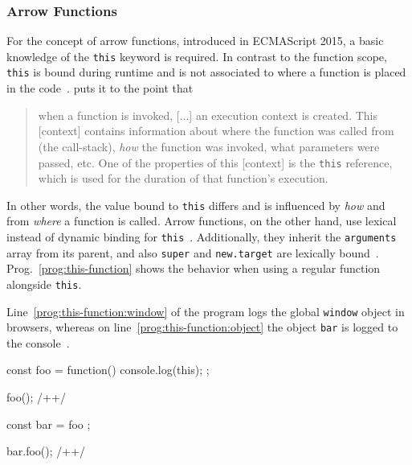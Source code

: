 \subsubsection{Arrow Functions}

For the concept of arrow functions, introduced in ECMAScript 2015, a basic knowledge of the \texttt{this} keyword is required. In contrast to the function scope, \texttt{this} is bound during runtime and is not associated to where a function is placed in the code~\cite[p.~9]{YDKJS:ThisAndObjectPrototypes:Simpson:2015}. \citeauthor{YDKJS:ThisAndObjectPrototypes:Simpson:2015} puts it to the point that
\begin{quote}
  when a function is invoked, [...] an execution context is created. This [context] contains information about where the function was called from (the call-stack), \emph{how} the function was invoked, what parameters were passed, etc. One of the properties of this [context] is the \texttt{this} reference, which is used for the duration of that function’s execution.~\cite[p.~1]{YDKJS:ThisAndObjectPrototypes:Simpson:2015}
\end{quote}
In other words, the value bound to \texttt{this} differs and is influenced by \emph{how} and from \emph{where} a function is called. Arrow functions, on the other hand, use lexical instead of dynamic binding for \texttt{this}~\cite[p.~58]{YDKJS:ES6AndBeyond:Simpson:2015}. Additionally, they inherit the \texttt{arguments} array from its parent, and also \texttt{super} and \texttt{new.target} are lexically bound~\cite[p.~59]{YDKJS:ES6AndBeyond:Simpson:2015}. Prog.~\ref{prog:this-function} shows the behavior when using a regular function alongside \texttt{this}.
\begin{program}
\caption{Line~\ref{prog:this-function:window} of the program logs the global \texttt{window} object in browsers, whereas on line~\ref{prog:this-function:object} the object \texttt{bar} is logged to the console~\cite[p.~18]{TypeScriptBook:Syed:2017}.}
\label{prog:this-function}
\begin{JsCode}
const foo = function() {
  console.log(this);
};

foo(); /+\label{prog:this-function:window}+/

const bar = { foo };

bar.foo(); /+\label{prog:this-function:object}+/
\end{JsCode}
\end{program}

